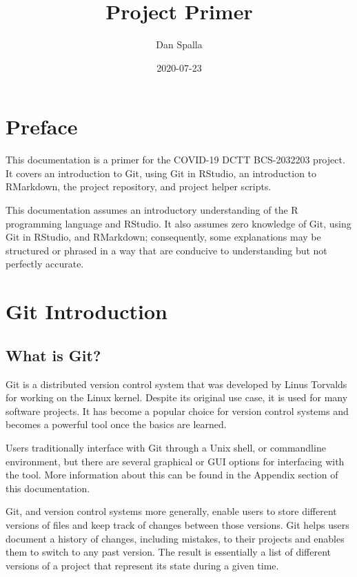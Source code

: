 \documentclass[
]{book}
\title{Project Primer}
\author{Dan Spalla}
\date{2020-07-23}
\begin{document}
\maketitle

{
\setcounter{tocdepth}{1}
\tableofcontents
}
\hypertarget{preface}{%
\chapter*{Preface}\label{preface}}

This documentation is a primer for the COVID-19 DCTT BCS-2032203 project. It covers an introduction to Git, using Git in RStudio, an introduction to RMarkdown, the project repository, and project helper scripts.

This documentation assumes an introductory understanding of the R programming language and RStudio. It also assumes zero knowledge of Git, using Git in RStudio, and RMarkdown; consequently, some explanations may be structured or phrased in a way that are conducive to understanding but not perfectly accurate.

\hypertarget{git-introduction}{%
\chapter{Git Introduction}\label{git-introduction}}

\hypertarget{what-is-git}{%
\section{What is Git?}\label{what-is-git}}

Git is a distributed version control system that was developed by Linus Torvalds for working on the Linux kernel. Despite its original use case, it is used for many software projects. It has become a popular choice for version control systems and becomes a powerful tool once the basics are learned.

Users traditionally interface with Git through a Unix shell, or commandline environment, but there are several graphical or GUI options for interfacing with the tool. More information about this can be found in the Appendix section of this documentation.

Git, and version control systems more generally, enable users to store different versions of files and keep track of changes between those versions. Git helps users document a history of changes, including mistakes, to their projects and enables them to switch to any past version. The result is essentially a list of different versions of a project that represent its state during a given time.
\end{document}
